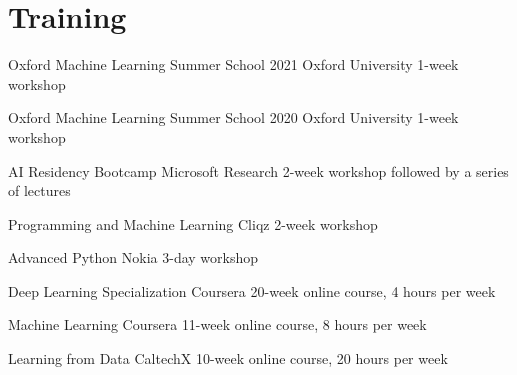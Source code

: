 \documentclass[]{friggeri-cv_osx}
\begin{document}
\section{Training}
\begin{entrylist}
\entry
{}
{Oxford Machine Learning Summer School 2021}
{Oxford University}
{1-week workshop}

\entry
{}
{Oxford Machine Learning Summer School 2020}
{Oxford University}
{1-week workshop}

\entry
{}
{AI Residency Bootcamp}
{Microsoft Research}
{2-week workshop followed by a series of lectures}

\entry
{}
{Programming and Machine Learning}
{Cliqz}
{2-week workshop}

\entry
{}
{Advanced Python}
{Nokia}
{3-day workshop}

\entry
{}
{Deep Learning Specialization}
{Coursera}
{20-week online course, 4 hours per week}

\entry
{}
{Machine Learning}
{Coursera}
{11-week online course, 8 hours per week}

\entry
{}
{Learning from Data}
{CaltechX}
{10-week online course, 20 hours per week}

\end{entrylist}
\end{document}
